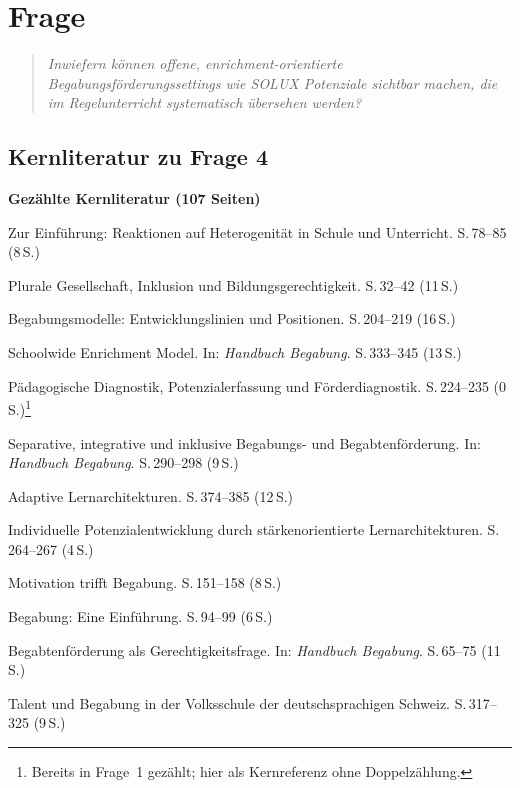 \documentclass[ngerman, a4paper]{article}
\begin{document}
\section{Frage}
\label{sec:frage4}
 
\begin{quote}\itshape
Inwiefern können offene, enrichment-orientierte 
Begabungsförderungssettings wie SOLUX Potenziale sichtbar machen, die 
im Regelunterricht systematisch übersehen werden?
\end{quote}

\subsection{Kernliteratur zu Frage 4}
 
\textbf{Gezählte Kernliteratur (107 Seiten)}

\begin{litdesc}
  \item[\cite{buholzerkummerwyss2010reaktionen}] Zur Einführung:
    Reaktionen auf Heterogenität in Schule und Unterricht. S.\,78--85
    (8\,S.)
  \item[\cite{muelleroppliger2021plurale}] Plurale Gesellschaft,
    Inklusion und Bildungsgerechtigkeit. S.\,32--42 (11\,S.)
  \item[\cite{muelleroppliger2021begabungsmodelle}] Begabungsmodelle:
    Entwicklungslinien und Positionen. S.\,204--219 (16\,S.)
  \item[\cite{reisrenzullimueller2021sem}] Schoolwide Enrichment Model.
    In: \textit{Handbuch Begabung}.
    S.\,333--345 (13\,S.)
  \item[\cite{muelleroppliger2021paeddiagnostik}] Pädagogische
    Diagnostik, Potenzialerfassung und Förderdiagnostik. S.\,224--235
    (0\,S.)\footnote{Bereits in Frage~1 gezählt; hier als Kernreferenz
    ohne Doppelzählung.}
  \item[\cite{weigand2021separativ}] Separative, integrative und
    inklusive Begabungs- und Begabtenförderung.
    In: \textit{Handbuch Begabung}.
    S.\,290--298 (9\,S.)
  \item[\cite{muelleroppliger2021adaptive}] Adaptive Lernarchitekturen.
    S.\,374--385 (12\,S.)
  \item[\cite{schulteterhardt2020potenzialentwicklung}] Individuelle
    Potenzialentwicklung durch stärkenorientierte Lernarchitekturen.
    S.\,264--267 (4\,S.)
  \item[\cite{lehwald2017motivation}] Motivation trifft Begabung.
    S.\,151--158 (8\,S.)
  \item[\cite{hoyer2013begabung}] Begabung: Eine Einführung.
    S.\,94--99 (6\,S.)
  \item[\cite{sedmak2021bildungsgerechtigkeit}] Begabtenförderung als
    Gerechtigkeitsfrage. In: \textit{Handbuch Begabung}. S.\,65--75 (11\,S.)
  \item[\cite{grossenbacher2014integrative}] Talent und Begabung in der
    Volksschule der deutschsprachigen Schweiz. S.\,317--325 (9\,S.)
\end{litdesc}
 
\end{document}
